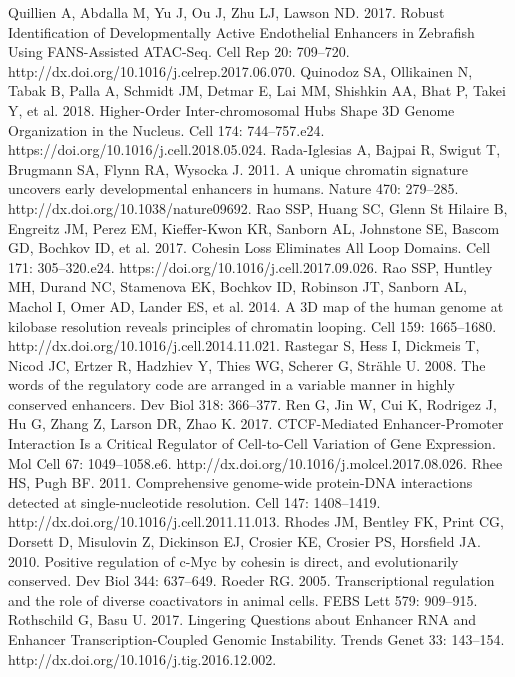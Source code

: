 \begin{thebibliography}{1}
	 Quillien A, Abdalla M, Yu J, Ou J, Zhu LJ, Lawson ND. 2017. Robust Identification of Developmentally Active Endothelial Enhancers in Zebrafish Using FANS-Assisted ATAC-Seq. Cell Rep 20: 709–720. http://dx.doi.org/10.1016/j.celrep.2017.06.070.
	 Quinodoz SA, Ollikainen N, Tabak B, Palla A, Schmidt JM, Detmar E, Lai MM, Shishkin AA, Bhat P, Takei Y, et al. 2018. Higher-Order Inter-chromosomal Hubs Shape 3D Genome Organization in the Nucleus. Cell 174: 744–757.e24. https://doi.org/10.1016/j.cell.2018.05.024.
	 Rada-Iglesias A, Bajpai R, Swigut T, Brugmann SA, Flynn RA, Wysocka J. 2011. A unique chromatin signature uncovers early developmental enhancers in humans. Nature 470: 279–285. http://dx.doi.org/10.1038/nature09692.
	 Rao SSP, Huang SC, Glenn St Hilaire B, Engreitz JM, Perez EM, Kieffer-Kwon KR, Sanborn AL, Johnstone SE, Bascom GD, Bochkov ID, et al. 2017. Cohesin Loss Eliminates All Loop Domains. Cell 171: 305–320.e24. https://doi.org/10.1016/j.cell.2017.09.026.
	 Rao SSP, Huntley MH, Durand NC, Stamenova EK, Bochkov ID, Robinson JT, Sanborn AL, Machol I, Omer AD, Lander ES, et al. 2014. A 3D map of the human genome at kilobase resolution reveals principles of chromatin looping. Cell 159: 1665–1680. http://dx.doi.org/10.1016/j.cell.2014.11.021.
	 Rastegar S, Hess I, Dickmeis T, Nicod JC, Ertzer R, Hadzhiev Y, Thies WG, Scherer G, Strähle U. 2008. The words of the regulatory code are arranged in a variable manner in highly conserved enhancers. Dev Biol 318: 366–377.
	 Ren G, Jin W, Cui K, Rodrigez J, Hu G, Zhang Z, Larson DR, Zhao K. 2017. CTCF-Mediated Enhancer-Promoter Interaction Is a Critical Regulator of Cell-to-Cell Variation of Gene Expression. Mol Cell 67: 1049–1058.e6. http://dx.doi.org/10.1016/j.molcel.2017.08.026.
	 Rhee HS, Pugh BF. 2011. Comprehensive genome-wide protein-DNA interactions detected at single-nucleotide resolution. Cell 147: 1408–1419. http://dx.doi.org/10.1016/j.cell.2011.11.013.
	 Rhodes JM, Bentley FK, Print CG, Dorsett D, Misulovin Z, Dickinson EJ, Crosier KE, Crosier PS, Horsfield JA. 2010. Positive regulation of c-Myc by cohesin is direct, and evolutionarily conserved. Dev Biol 344: 637–649.
	 Roeder RG. 2005. Transcriptional regulation and the role of diverse coactivators in animal cells. FEBS Lett 579: 909–915.
	 Rothschild G, Basu U. 2017. Lingering Questions about Enhancer RNA and Enhancer Transcription-Coupled Genomic Instability. Trends Genet 33: 143–154. http://dx.doi.org/10.1016/j.tig.2016.12.002.

\end{thebibliography}
